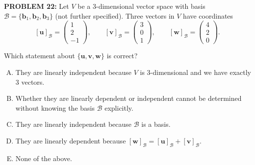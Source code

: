 \documentclass[12pt]{amsart}
\begin{document}
{\bf PROBLEM 22:}
%
Let $V$ be a 3-dimensional vector space with basis $\mathcal{B} = \{\mathbf{b}_1, \mathbf{b}_2, \mathbf{b}_3\}$ (not further specified). Three vectors in $V$ have coordinates
$$[\mathbf{u}]_\mathcal{B} = \begin{pmatrix} 1 \\ 2 \\ -1 \end{pmatrix}, \qquad [\mathbf{v}]_\mathcal{B} = \begin{pmatrix} 3 \\ 0 \\ 1 \end{pmatrix}, \qquad [\mathbf{w}]_\mathcal{B} = \begin{pmatrix} 4 \\ 2 \\ 0 \end{pmatrix}.$$

Which statement about $\{\mathbf{u}, \mathbf{v}, \mathbf{w}\}$ is correct?

\begin{enumerate}[(A)]
\item They are linearly independent because $V$ is 3-dimensional and we have exactly 3 vectors.
\item Whether they are linearly dependent or independent cannot be determined without knowing the basis $\mathcal{B}$ explicitly.
\item They are linearly independent because $\mathcal{B}$ is a basis.
\item They are linearly dependent because $[\mathbf{w}]_\mathcal{B} = [\mathbf{u}]_\mathcal{B} + [\mathbf{v}]_\mathcal{B}$.
\item None of the above.
\end{enumerate}
\end{document}
